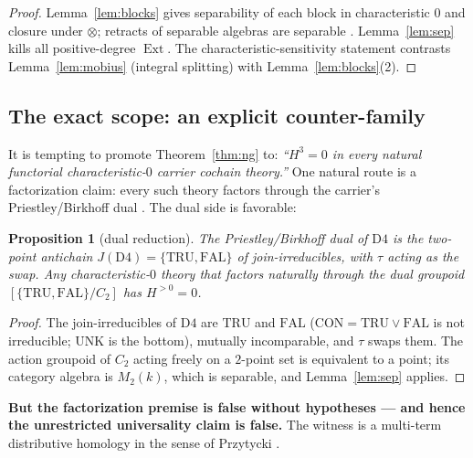 \documentclass[11pt]{article}
\newtheorem{proposition}[theorem]{Proposition}
\theoremstyle{definition}
\theoremstyle{remark}
\newcommand{\UNK}{\mathrm{UNK}}
\newcommand{\TRU}{\mathrm{TRU}}
\newcommand{\FAL}{\mathrm{FAL}}
\newcommand{\CON}{\mathrm{CON}}
\newcommand{\Dfour}{\mathrm{D4}}
\newcommand{\Ext}{\operatorname{Ext}}
\begin{document}
\begin{proof}
Lemma~\ref{lem:blocks} gives separability of each block in characteristic $0$ and closure under $\otimes$; retracts of separable algebras are separable \cite{demeyer}. Lemma~\ref{lem:sep} kills all positive-degree $\Ext$. The characteristic-sensitivity statement contrasts Lemma~\ref{lem:mobius} (integral splitting) with Lemma~\ref{lem:blocks}(2).
\end{proof}

\subsection{The exact scope: an explicit counter-family}\label{subsec:scope}

It is tempting to promote Theorem~\ref{thm:ng} to: \emph{``$H^3=0$ in every natural functorial characteristic-$0$ carrier cochain theory.''} One natural route is a factorization claim: every such theory factors through the carrier's Priestley/Birkhoff dual \cite{priestley}. The dual side is favorable:

\begin{proposition}[dual reduction]\label{prop:dual}
The Priestley/Birkhoff dual of $\Dfour$ is the two-point antichain $J(\Dfour)=\{\TRU,\FAL\}$ of join-irreducibles, with $\tau$ acting as the swap. Any characteristic-$0$ theory that factors naturally through the dual groupoid $[\{\TRU,\FAL\}/C_2]$ has $H^{>0}=0$.
\end{proposition}

\begin{proof}
The join-irreducibles of $\Dfour$ are $\TRU$ and $\FAL$ ($\CON=\TRU\vee\FAL$ is not irreducible; $\UNK$ is the bottom), mutually incomparable, and $\tau$ swaps them. The action groupoid of $C_2$ acting freely on a $2$-point set is equivalent to a point; its category algebra is $M_2(k)$, which is separable, and Lemma~\ref{lem:sep} applies.
\end{proof}

\textbf{But the factorization premise is false without hypotheses --- and hence the unrestricted universality claim is false.} The witness is a multi-term distributive homology in the sense of Przytycki \cite{przytycki, przyputyra}.
\end{document}
